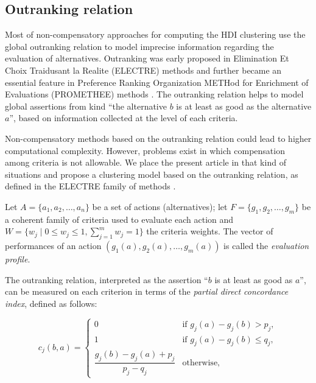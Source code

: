 \documentclass[]{elsarticle}
\theoremstyle{definition}
\begin{document}
\subsection{Outranking relation}\label{classification}

Most of non-compensatory approaches for computing the HDI clustering use the global outranking relation to model imprecise information regarding the evaluation of alternatives. Outranking was early proposed in Elimination Et Choix Traidusant la Realite (ELECTRE) methods \citep{figueira2010} and further became an essential feature in  Preference Ranking Organization METHod for Enrichment of Evaluations (PROMETHEE) methods \cite{brans85}. The outranking relation helps to model global  assertions from kind ``the alternative $b$ is at least as good as the alternative $a$'', based on information collected at the level of each criteria. 

Non-compensatory methods based on the outranking relation could lead to higher computational complexity. However, problems exist in which compensation among criteria is not allowable. We place the present article in that kind of situations and propose a clustering model based on the outranking relation, as defined in the ELECTRE family of methods \citep{figueira2010}.

Let $A=\{a_1,a_2,\ldots,a_n\}$ be a set of actions (alternatives);  let $F=\{g_1,g_2,\ldots,g_m\}$ be a coherent family of criteria used to evaluate each action and $W=\{w_j \mid 0 \leq w_j \leq 1, \sum_{j=1}^m w_j =1\}$ the criteria weights.  The vector of performances of an action  $(g_1(a),g_2(a),\ldots,g_m(a))$   is called the \emph{evaluation profile}. 



The outranking relation, interpreted as the assertion ``$b$ is at least as good as $a$'',  can be measured on each criterion in terms of  the \emph{partial direct concordance index}, defined as follows: 

{\footnotesize
\begin{equation}
c_j(b,a) =
\begin{cases}
	0							& \mbox{if  $g_j(a)-g_j(b) > p_j$}, \\
	1							& \mbox{if  $g_j(a)-g_j(b) \leq q_j$},   \\
	\dfrac{g_j(b)-g_j(a)+p_j}{p_j-q_j} 	& \mbox{otherwise}, 				     	      
 \end{cases} 
 \label{credibility}
 \end{equation} 
}
\end{document}
